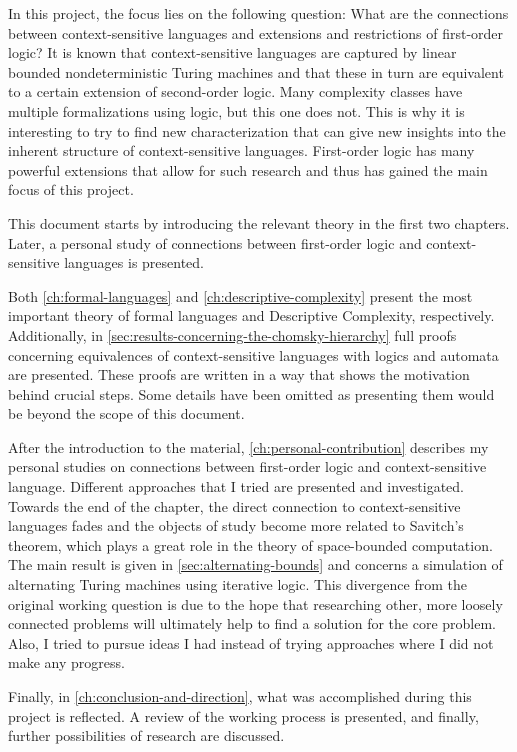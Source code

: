 In this project, the focus lies on the following question: What are the connections between context-sensitive languages and extensions and restrictions of first-order logic?
It is known that context-sensitive languages are captured by linear bounded nondeterministic Turing machines and that these in turn are equivalent to a certain extension of second-order logic.
Many complexity classes have multiple formalizations using logic, but this one does not.
This is why it is interesting to try to find new characterization that can give new insights into the inherent structure of context-sensitive languages.
First-order logic has many powerful extensions that allow for such research and thus has gained the main focus of this project.

This document starts by introducing the relevant theory in the first two chapters.
Later, a personal study of connections between first-order logic and context-sensitive languages is presented.

Both \cref{ch:formal-languages} and \cref{ch:descriptive-complexity} present the most important theory of formal languages and Descriptive Complexity, respectively.
Additionally, in \cref{sec:results-concerning-the-chomsky-hierarchy} full proofs concerning equivalences of context-sensitive languages with logics and automata are presented.
These proofs are written in a way that shows the motivation behind crucial steps.
Some details have been omitted as presenting them would be beyond the scope of this document.

After the introduction to the material, \cref{ch:personal-contribution} describes my personal studies on connections between first-order logic and context-sensitive language.
Different approaches that I tried are presented and investigated.
Towards the end of the chapter, the direct connection to context-sensitive languages fades and the objects of study become more related to Savitch's theorem, which plays a great role in the theory of space-bounded computation.
The main result is given in \cref{sec:alternating-bounds} and concerns a simulation of alternating Turing machines using iterative logic.
This divergence from the original working question is due to the hope that researching other, more loosely connected problems will ultimately help to find a solution for the core problem.
Also, I tried to pursue ideas I had instead of trying approaches where I did not make any progress.

Finally, in \cref{ch:conclusion-and-direction}, what was accomplished during this project is reflected.
A review of the working process is presented, and finally, further possibilities of research are discussed.

